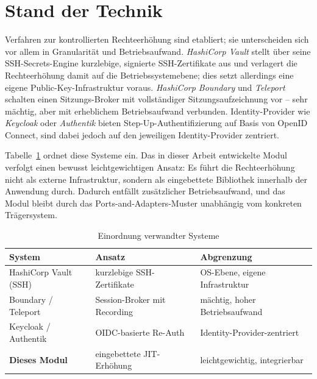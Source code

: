 \documentclass[11pt,a4paper]{article}
\begin{document}
\section{Stand der Technik}

Verfahren zur kontrollierten Rechteerhöhung sind etabliert; sie unterscheiden
sich vor allem in Granularität und Betriebsaufwand. \emph{HashiCorp Vault}
stellt über seine SSH-Secrets-Engine kurzlebige, signierte SSH-Zertifikate aus
und verlagert die Rechteerhöhung damit auf die Betriebssystemebene; dies setzt
allerdings eine eigene Public-Key-Infrastruktur voraus. \emph{HashiCorp
Boundary} und \emph{Teleport} schalten einen Sitzungs-Broker mit vollständiger
Sitzungsaufzeichnung vor -- sehr mächtig, aber mit erheblichem Betriebsaufwand
verbunden. Identity-Provider wie \emph{Keycloak} oder \emph{Authentik} bieten
Step-Up-Authentifizierung auf Basis von OpenID Connect, sind dabei jedoch auf
den jeweiligen Identity-Provider zentriert.

Tabelle~\ref{tab:sota} ordnet diese Systeme ein. Das in dieser Arbeit
entwickelte Modul verfolgt einen bewusst leichtgewichtigen Ansatz: Es führt die
Rechteerhöhung nicht als externe Infrastruktur, sondern als eingebettete
Bibliothek innerhalb der Anwendung durch. Dadurch entfällt zusätzlicher
Betriebsaufwand, und das Modul bleibt durch das Ports-and-Adapters-Muster
unabhängig vom konkreten Trägersystem.

\begin{table}[htbp]
  \centering
  \caption{Einordnung verwandter Systeme}
  \label{tab:sota}
  \begin{tabular}{@{}lll@{}}
    \toprule
    \textbf{System} & \textbf{Ansatz} & \textbf{Abgrenzung} \\
    \midrule
    HashiCorp Vault (SSH)      & kurzlebige SSH-Zertifikate     & OS-Ebene, eigene Infrastruktur \\
    Boundary / Teleport        & Session-Broker mit Recording   & mächtig, hoher Betriebsaufwand \\
    Keycloak / Authentik       & OIDC-basierte Re-Auth          & Identity-Provider-zentriert \\
    \textbf{Dieses Modul}      & eingebettete JIT-Erhöhung      & leichtgewichtig, integrierbar \\
    \bottomrule
  \end{tabular}
\end{table}

\end{document}
